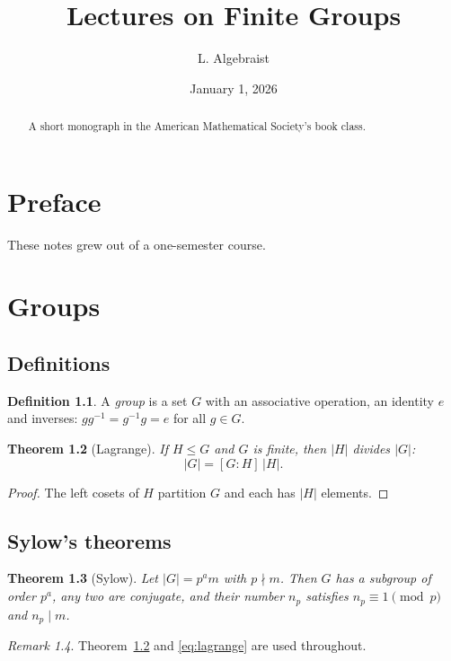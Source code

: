 \documentclass{amsbook}
\newtheorem{theorem}{Theorem}[chapter]
\theoremstyle{definition}
\newtheorem{definition}[theorem]{Definition}
\theoremstyle{remark}
\newtheorem{remark}[theorem]{Remark}
\numberwithin{section}{chapter}
\numberwithin{equation}{chapter}
\begin{document}
\frontmatter
\title{Lectures on Finite Groups}
\author{L. Algebraist}
\address{Department of Mathematics, University of Examples}
\date{January 1, 2026}
\begin{abstract}
A short monograph in the American Mathematical Society's book class.
\end{abstract}
\maketitle
\tableofcontents
\chapter*{Preface}
These notes grew out of a one-semester course.
\mainmatter
\chapter{Groups}
\section{Definitions}
\begin{definition}\label{def:group}
A \emph{group} is a set $G$ with an associative operation, an identity
$e$ and inverses: $g g^{-1} = g^{-1} g = e$ for all $g \in G$.
\end{definition}
\begin{theorem}[Lagrange]\label{thm:lagrange}
If $H \le G$ and $G$ is finite, then $|H|$ divides $|G|$:
\begin{equation}\label{eq:lagrange}
  |G| = [G:H]\,|H| .
\end{equation}
\end{theorem}
\begin{proof}
The left cosets of $H$ partition $G$ and each has $|H|$ elements.
\end{proof}
\section{Sylow's theorems}
\begin{theorem}[Sylow]
Let $|G| = p^a m$ with $p \nmid m$. Then $G$ has a subgroup of order
$p^a$, any two are conjugate, and their number $n_p$ satisfies
$n_p \equiv 1 \pmod p$ and $n_p \mid m$.
\end{theorem}
\begin{remark}
Theorem~\ref{thm:lagrange} and \eqref{eq:lagrange} are used throughout.
\end{remark}
\end{document}
